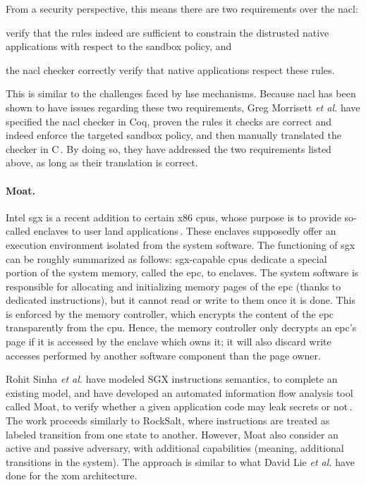From a security perspective, this means there are two requirements over the
\ac{nacl}:
%
\begin{inparaenum}[(1)]
\item verify that the rules indeed are sufficient to constrain the distrusted
  native applications with respect to the sandbox policy, and
%
\item the \ac{nacl} checker correctly verify that native applications respect
  these rules.
\end{inparaenum}
%
This is similar to the challenges faced by \ac{hse} mechanisms.
%
Because \ac{nacl} has been shown to have issues regarding these two
requirements, Greg Morrisett \emph{et al.} have specified the \ac{nacl} checker
in Coq, proven the rules it checks are correct and indeed enforce the targeted
sandbox policy, and then manually translated the checker in
C\,\cite{morrisett2012rocksalt}.
%
By doing so, they have addressed the two requirements listed above, as long as
their translation is correct.

\paragraph{Moat.}
%
Intel \ac{sgx} is a recent addition to certain x86 \acp{cpu}, whose purpose is
to provide so-called enclaves to user land
applications\,\cite{costan2016sgxexplained}.
%
These enclaves supposedly offer an execution environment isolated from the
system software.
%
The functioning of \ac{sgx} can be roughly summarized as follows:
\ac{sgx}-capable \acp{cpu} dedicate a special portion of the system memory,
called the \ac{epc}, to enclaves.
%
The system software is responsible for allocating and initializing memory pages
of the \ac{epc} (thanks to dedicated instructions), but it cannot read or write
to them once it is done.
%
This is enforced by the memory controller, which encrypts the content of the
\ac{epc} transparently from the \ac{cpu}.
%
Hence, the memory controller only decrypts an \ac{epc}'s page if it is accessed
by the enclave which owns it; it will also discard write accesses performed by
another software component than the page owner.

Rohit Sinha \emph{et al.} have modeled SGX instructions semantics, to complete
an existing model, and have developed an automated information flow analysis
tool called Moat, to verify whether a given application code may leak secrets or
not\,\cite{sinha2015moat}.
%
The work proceeds similarly to RockSalt, where instructions are treated as
labeled transition from one state to another.
%
However, Moat also consider an active and passive adversary, with additional
capabilities (meaning, additional transitions in the system).
%
The approach is similar to what David Lie \emph{et al.} have done for the
\ac{xom} architecture.

